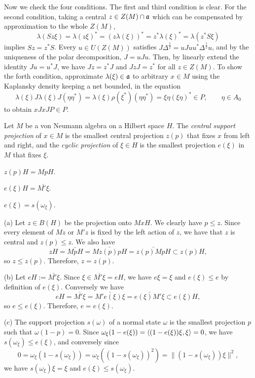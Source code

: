 \documentclass{../../../small}
\begin{document}
\begin{pf}
Now we check the four conditions.
The first and third condition is clear.
For the second condition, taking a central $z\in Z(M)\cap\mathfrak{a}$ which can be compensated by approximation to the whole $Z(M)$,
\[\lambda(Sz\xi)=\lambda(z\xi)^*=(z\lambda(\xi))^*=z^*\lambda(\xi)^*=\lambda(z^*S\xi)\]
implies $Sz=z^*S$.
Every $u\in U(Z(M))$ satisfies $J\Delta^{\frac12}=uJuu^*\Delta^{\frac12}u$, and by the uniqueness of the polar decomposition, $J=uJu$.
Then, by linearly extend the identity $Ju=u^*J$, we have $Jz=z^*J$ and $JzJ=z^*$ for all $z\in Z(M)$.
To show the forth condition, approximate $\lambda(\xi)\in\mathfrak{a}$ to arbitrary $x\in M$ using the Kaplansky density keeping a net bounded, in the equation
\[\lambda(\xi)J\lambda(\xi)J(\eta\eta^*)=\lambda(\xi)\rho(\xi^*)(\eta\eta^*)=\xi\eta(\xi\eta)^*\in P,\qquad\eta\in A_0\]
to obtain $xJxJP\in P$.
\end{pf}

\begin{lem}
Let $M$ be a von Neumann algebra on a Hilbert space $H$.
The \emph{central support projection} of $x\in M$ is the smallest central projection $z(p)$ that fixes $x$ from left and right, and the \emph{cyclic projection} of $\xi\in H$ is the smallest projection $e(\xi)$ in $M$ that fixes $\xi$.
\begin{parts}
\item $z(p)H=MpH$.
\item $e(\xi)H=\bar{M'\xi}$.
\item $e(\xi)=s(\omega_\xi)$.
\end{parts}
\end{lem}
\begin{pf}
(a)
Let $z\in B(H)$ be the projection onto $MxH$.
We clearly have $p\le z$.
Since every element of $Mz$ or $M'z$ is fixed by the left action of $z$, we have that $z$ is central and $z(p)\le z$.
We also have
\[zH=\bar{MpH}=\bar{Mz(p)pH}=\bar{z(p)MpH}\subset z(p)H,\]
so $z\le z(p)$.
Therefore, $z=z(p)$.

(b)
Let $eH:=\bar{M'\xi}$.
Since $\xi\in\bar{M'\xi}=eH$, we have $e\xi=\xi$ and $e(\xi)\le e$ by definition of $e(\xi)$.
Conversely we have
\[eH=\bar{M'\xi}=\bar{M'e(\xi)\xi}=\bar{e(\xi)M'\xi}\subset e(\xi)H,\]
so $e\le e(\xi)$.
Therefore, $e=e(\xi)$.

(c)
The support projection $s(\omega)$ of a normal state $\omega$ is the smallest projection $p$ such that $\omega(1-p)=0$.
Since $\omega_\xi(1-e(\xi))=\langle(1-e(\xi))\xi,\xi\rangle=0$, we have $s(\omega_\xi)\le e(\xi)$, and conversely since
\[0=\omega_\xi(1-s(\omega_\xi))=\omega_\xi((1-s(\omega_\xi))^2)=\|(1-s(\omega_\xi))\xi\|^2,\]
we have $s(\omega_\xi)\xi=\xi$ and $e(\xi)\le s(\omega_\xi)$.
\end{pf}
\end{document}
